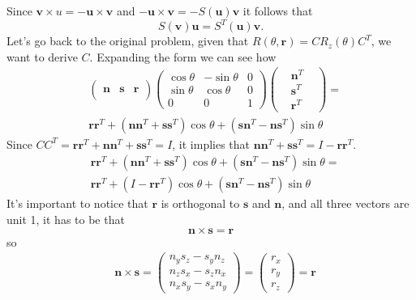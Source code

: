 \documentclass[10pt, letterpaper]{report}
\begin{document}
Since $\mathbf v\times u=-\mathbf u\times \mathbf v$ and $-\mathbf u\times \mathbf v=-S(\mathbf u)\mathbf v$ it follows that \begin{equation}
    S(\mathbf v)\mathbf u = S^{T}(\mathbf u)\mathbf v.
\end{equation}
Let's go back to the original problem, given that $R(\theta,\mathbf r)=CR_z(\theta)C^T$, we want to derive $C$. Expanding the form we can see how\begin{align}
   & \begin{pmatrix}
        &&\\
        \mathbf n&\mathbf s&\mathbf r\\
        &&
    \end{pmatrix}
    \begin{pmatrix}
        \cos\theta&-\sin\theta&0\\ 
        \sin\theta&\cos\theta&0\\ 
        0&0&1
    \end{pmatrix}
    \begin{pmatrix}
        &\mathbf n^T&\\ &\mathbf s^T& \\&\mathbf r^T& 
    \end{pmatrix}=\\
    & \mathbf r\mathbf r^T+
    (\mathbf n\mathbf n^T+\mathbf s\mathbf s^T)\cos\theta+
    (\mathbf s\mathbf n^T-\mathbf n\mathbf s^T)\sin\theta
\end{align}
Since $CC^T= \mathbf r\mathbf r^T+
    \mathbf n\mathbf n^T+\mathbf s\mathbf s^T=I$, it implies that $\mathbf n\mathbf n^T+\mathbf s\mathbf s^T=I-\mathbf r\mathbf r^T$.\begin{align}
        &\mathbf r\mathbf r^T+
    (\mathbf n\mathbf n^T+\mathbf s\mathbf s^T)\cos\theta+
    (\mathbf s\mathbf n^T-\mathbf n\mathbf s^T)\sin\theta=\\ 
    &\mathbf r\mathbf r^T+
    (I-\mathbf r\mathbf r^T)\cos\theta+
    (\mathbf s\mathbf n^T-\mathbf n\mathbf s^T)\sin\theta
    \end{align}
It's important to notice that $\mathbf r$ is orthogonal to $\mathbf s$ and $\mathbf n$, and all three vectors are unit 1, it has to be that 
\begin{equation}
    \mathbf n \times\mathbf s =\mathbf r 
\end{equation}
so\begin{align}
     &\mathbf n \times\mathbf s =\begin{pmatrix}
        n_ys_z-s_yn_z\\ 
        n_zs_x-s_zn_x\\ 
        n_xs_y-s_xn_y
     \end{pmatrix}=\begin{pmatrix}
        r_x\\ r_y\\ r_z 
     \end{pmatrix}=\mathbf r
\end{align}
\end{document}
